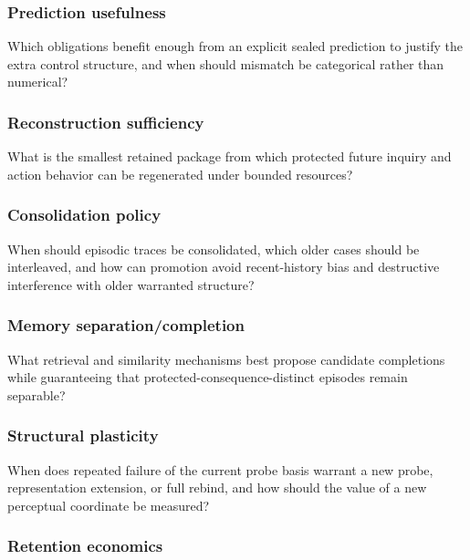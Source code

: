 \documentclass[
]{article}
\begin{document}
\subsubsection{Prediction usefulness}\label{prediction-usefulness}

Which obligations benefit enough from an explicit sealed prediction to justify
the extra control structure, and when should mismatch be categorical rather
than numerical?

\subsubsection{Reconstruction sufficiency}\label{reconstruction-sufficiency}

What is the smallest retained package from which protected future inquiry and
action behavior can be regenerated under bounded resources?

\subsubsection{Consolidation policy}\label{consolidation-policy}

When should episodic traces be consolidated, which older cases should be
interleaved, and how can promotion avoid recent-history bias and destructive
interference with older warranted structure?

\subsubsection{Memory separation/completion}\label{memory-separation-completion}

What retrieval and similarity mechanisms best propose candidate completions
while guaranteeing that protected-consequence-distinct episodes remain
separable?

\subsubsection{Structural plasticity}\label{structural-plasticity}

When does repeated failure of the current probe basis warrant a new probe,
representation extension, or full rebind, and how should the value of a new
perceptual coordinate be measured?

\subsubsection{Retention economics}\label{retention-economics}
\end{document}

